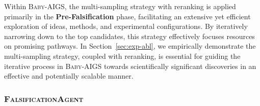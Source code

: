 \documentclass{article} %
\newcommand{\AIGSSys}{\textsc{Baby-AIGS}\xspace}
\newcommand{\ProposalAgent}{\textsc{ProposalAgent}\xspace}
\newcommand{\ExperimentAgent}{\textsc{ExpAgent}\xspace}
\newcommand{\ReviewAgent}{\textsc{ReviewAgent}\xspace}
\newcommand{\FalsificationAgent}{\textsc{FalsificationAgent}\xspace}
\begin{document}



 Within \AIGSSys, the multi-sampling strategy with reranking is applied primarily in the \textbf{Pre-Falsification} phase, facilitating an extensive yet efficient exploration of ideas, methods, and experimental configurations. By iteratively narrowing down to the top candidates, this strategy effectively focuses resources on promising pathways. 
In Section~\ref{sec:exp-abl}, we empirically demonstrate the multi-sampling strategy, coupled with reranking, is essential for guiding the iterative process in \AIGSSys towards scientifically significant discoveries in an effective and potentially scalable manner. 


\subsubsection{\FalsificationAgent}\label{sec:falsi-agent}
\end{document}
